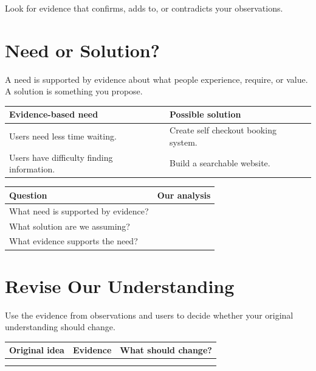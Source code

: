 \documentclass[12pt,a4paper]{article}
\begin{document}
	Look for evidence that confirms, adds to, or contradicts your observations.

	\section{Need or Solution?}
	
	A need is supported by evidence about what people experience, require, or value. A solution is something you propose.
	
	\begin{center}
		\small
		\begin{tabular}{|L{0.40\textwidth}|L{0.43\textwidth}|}
			\hline
			\textbf{Evidence-based need} & \textbf{Possible solution} \\
			\hline
			Users need less time waiting. & Create self checkout booking system. \\
			\hline
			Users have difficulty finding information. & Build a searchable website. \\
			\hline
		\end{tabular}
	\end{center}
	
	\begin{center}
		\small
		\begin{tabular}{|L{0.30\textwidth}|L{0.53\textwidth}|}
			\hline
			\textbf{Question} & \textbf{Our analysis} \\
			\hline
			What need is supported by evidence? & \rule{0pt}{1.0cm} \\
			\hline
			What solution are we assuming? & \rule{0pt}{1.0cm} \\
			\hline
			What evidence supports the need? & \rule{0pt}{1.0cm} \\
			\hline
		\end{tabular}
	\end{center}
	
	\vspace{-0.39cm}
		
	\section{Revise Our Understanding}
		\vspace{-0.09cm}
	Use the evidence from observations and users to decide whether your original understanding should change.
	
	\begin{center}
		\small
		\begin{tabular}{|L{0.27\textwidth}|L{0.27\textwidth}|L{0.27\textwidth}|}
			\hline
			\textbf{Original idea} & \textbf{Evidence} & \textbf{What should change?} \\
			\hline
			\rule{0pt}{1.4cm} & \rule{0pt}{1.4cm} & \rule{0pt}{1.4cm} \\
			\hline
			\rule{0pt}{1.4cm} & \rule{0pt}{1.4cm} & \rule{0pt}{1.4cm} \\
			\hline
		\end{tabular}
	\end{center}
	
\end{document}
